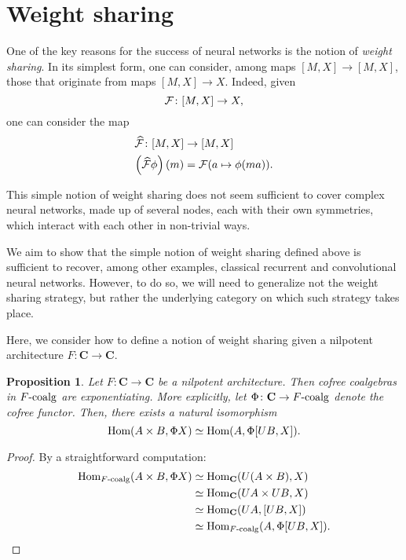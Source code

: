 \documentclass[12pt]{article}
\newtheorem{proposition}{Proposition}
\newcommand{\Hom}{{\textnormal{Hom}}}
\newcommand{\Cat}{{\mathbf{C}}}
\newcommand{\Coalg}{{F\textnormal{-coalg}}}
\begin{document}
\section{Weight sharing}

One of the key reasons for the success of neural networks is the notion of {\em weight sharing}. In its simplest form, one can consider, among maps $[M, X] \rightarrow [M, X]$, those that originate from maps $[M, X] \rightarrow X$. Indeed, given
\begin{equation*}
    {\cal F} \colon [M, X] \rightarrow X,
\end{equation*}
one can consider the map
\begin{align*}
    \widehat{\cal F} \colon [M, X]       & \rightarrow [M, X]              \\
    \left(\widehat{\cal F}\phi\right)(m) & = {\cal F}(a \mapsto \phi(ma)).
\end{align*}

This simple notion of weight sharing does not seem sufficient to cover complex neural networks, made up of several nodes, each with their own symmetries, which interact with each other in non-trivial ways.

We aim to show that the simple notion of weight sharing defined above is sufficient to recover, among other examples, classical recurrent and convolutional neural networks. However, to do so, we will need to generalize not the weight sharing strategy, but rather the underlying category on which such strategy takes place.

Here, we consider how to define a notion of weight sharing given a nilpotent architecture $F\colon\Cat \rightarrow \Cat$.

\begin{proposition}\label{prop:cofree_exponentiating}
    Let $F\colon \Cat \rightarrow \Cat$ be a nilpotent architecture. Then cofree coalgebras in $\Coalg$ are exponentiating. More explicitly, let $\Phi\colon \Cat \rightarrow \Coalg$ denote the cofree functor. Then, there exists a natural isomorphism
    \begin{equation*}
        \Hom(A\times B, \Phi X) \simeq \Hom(A, \Phi[UB, X]).
    \end{equation*}
\end{proposition}

\begin{proof}
    By a straightforward computation:
    \begin{align*}
        \Hom_{\Coalg}(A\times B, \Phi X)
         & \simeq \Hom_{\Cat}(U(A \times B), X) \\
         & \simeq \Hom_{\Cat}(UA \times UB, X)  \\
         & \simeq \Hom_{\Cat}(UA, [UB, X])      \\
         & \simeq \Hom_{\Coalg}(A, \Phi[UB, X]).
    \end{align*}
\end{proof}
\end{document}
